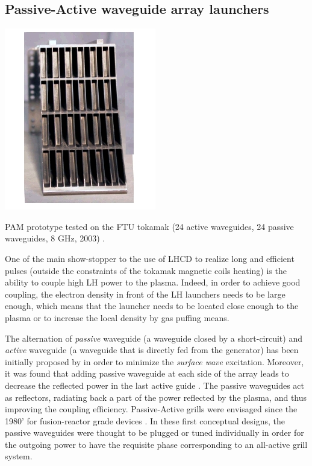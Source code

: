 \subsection{Passive-Active waveguide array launchers}
\begin{marginfigure}
	\centering
	\includegraphics[width=0.8\linewidth]{figures/chap3/Pam_FTU}
	\caption{PAM prototype tested on the FTU tokamak (24 active waveguides, 24 passive waveguides, 8 GHz, 2003) \cite{mirizzi2003, ridolfini2005}.}
	\label{fig:pamftu}
\end{marginfigure}
One of the main show-stopper to the use of LHCD to realize long and efficient pulses (outside the constraints of the tokamak magnetic coils heating) is the ability to couple high LH power to the plasma. Indeed, in order to achieve good coupling, the electron density in front of the LH launchers needs to be large enough, which means that the launcher needs to be located close enough to the plasma or to increase the local density by gas puffing means. 

The alternation of \emph{passive} waveguide (a waveguide closed by a short-circuit) and \emph{active} waveguide (a waveguide that is directly fed from the generator) has been initially proposed by  in order to minimize the \emph{surface wave} excitation. Moreover, it was found that adding passive waveguide at each side of the array leads to decrease the reflected power in the last active guide . The passive waveguides act as reflectors, radiating back a part of the power reflected by the plasma, and thus improving the coupling efficiency. Passive-Active grills were envisaged since the 1980' for fusion-reactor grade devices . In these first conceptual designs, the passive waveguides were thought to be plugged or tuned individually in order for the outgoing power to have the requisite phase corresponding to an all-active grill system. 

